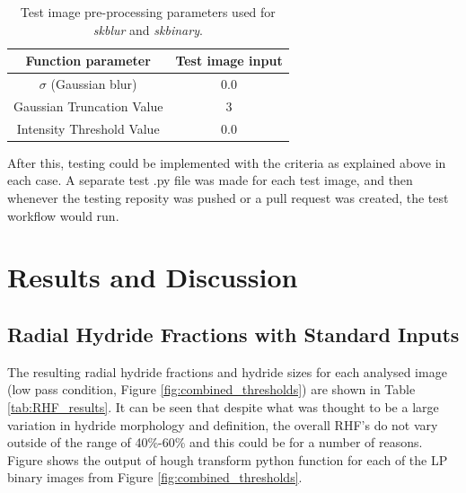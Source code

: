 \documentclass{article}
\begin{document}
    \begin{table}[h]
        \centering
        \begin{tabular}{|c|c|}
        \hline
            \textbf{Function parameter} & \textbf{Test image input}  \\
            \hline
            $\sigma$ (Gaussian blur) & 0.0 \\
            \hline
            Gaussian Truncation Value & 3 \\
            \hline
            Intensity Threshold Value & 0.0 \\ 
        \hline
        \end{tabular}
    \caption{Test image pre-processing parameters used for \textit{skblur} and \textit{skbinary}.}
    \label{tab:TestImageTable}
    \end{table}

    \noindent After this, testing could be implemented with the criteria as explained above in each case. A separate test .py file was made for each test image, and then whenever the testing reposity was pushed or a pull request was created, the test workflow would run.

\section{Results and Discussion}
\subsection{Radial Hydride Fractions with Standard Inputs}
    The resulting radial hydride fractions and hydride sizes for each analysed image (low pass condition, Figure \ref{fig:combined_thresholds}) are shown in Table \ref{tab:RHF_results}. It can be seen that despite what was thought to be a large variation in hydride morphology and definition, the overall RHF's do not vary outside of the range of 40\%-60\% and this could be for a number of reasons. Figure shows the output of hough transform python function for each of the LP binary images from Figure \ref{fig:combined_thresholds}.
\end{document}
